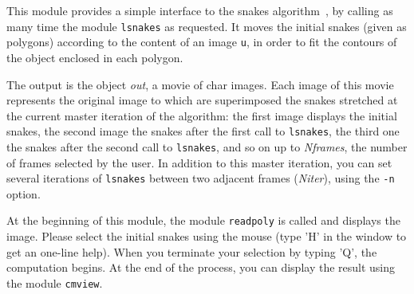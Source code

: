 This module provides a simple interface to the snakes 
algorithm~\cite{caselles.catte.ea:geometric}, by calling
as many time the module \verb+lsnakes+ as requested.
It moves the initial snakes (given as polygons) according to the content of an
image \verb+u+, in order to fit the contours of the object enclosed in each polygon.

The output is the object {\em out}, a movie of char images.
Each image of this movie represents the original image to which are superimposed
the snakes stretched at the current master iteration of the algorithm:
the first image displays the initial snakes, the second image the snakes after
the first call to \verb+lsnakes+, the third one the snakes after the second call
to \verb+lsnakes+, and so on up to {\em Nframes}, the number of frames selected by the user.
In addition to this master iteration, you can set several iterations of
\verb+lsnakes+ between two adjacent frames ({\em Niter}), using the \verb+-n+ option.

At the beginning of this module, the module \verb+readpoly+ is called and
displays the image. Please select the initial snakes using the mouse (type 'H'
in the window to get an one-line help). 
When you terminate your selection by typing 'Q', the computation begins.
At the end of the process, you can display the result using the module
\verb+cmview+.
